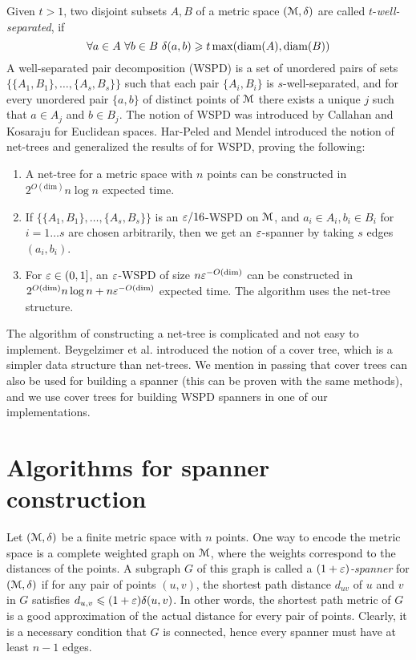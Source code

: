 \documentclass[a4paper,UKenglish,cleveref, autoref]{lipics-v2019}
\begin{document}
Given $t > 1$, two disjoint subsets $A, B$ of a metric space $(\mathcal{M}, \delta)$ are called $t$-\textit{well-separated},
if 
\[
\forall a \in A \,\, \forall b \in B \,\, \delta(a, b) \geqslant t \max(\mathrm{diam}(A), \mathrm{diam}(B))
\]
A well-separated pair decomposition (WSPD) is a set of unordered pairs of sets $\{ \{A_1, B_1 \}, 
\dots, \{A_s, B_s\} \}$ such that each pair $\{A_i, B_i\}$ is $s$-well-separated, and for every unordered pair $\{a, b\}$ of distinct points of $\mathcal{M}$ there exists a unique $j$ such that $a \in A_j$ and $b \in B_j$.
The notion of WSPD was introduced by Callahan and Kosaraju \cite{cal-kos-wspd} for Euclidean spaces.
Har-Peled and Mendel \cite{hm-fast} 
introduced the notion of net-trees and
generalized the results of \cite{cal-kos-wspd} for WSPD, proving the following:
\begin{enumerate}
    \item A net-tree for a metric space with $n$ points can be constructed in $2^{O(\mbox{dim})} n \log n$ expected time.
    \item If $\{ \{A_1, B_1 \}, 
\dots, \{A_s, B_s\} \}$ is an $\varepsilon / 16$-WSPD on $\mathcal{M}$, and $a_i \in A_i, b_i \in B_i$ for $i = 1\dots s$
are chosen arbitrarily, then we get an $\varepsilon$-spanner by taking $s$ edges $(a_i, b_i)$.
    \item For $\varepsilon \in (0, 1]$,  an $\varepsilon$-WSPD of size $n \varepsilon^{-O({\dim})}$ can be constructed in $2^{O({\dim})} n \log n + n \varepsilon ^{-O({\dim})}$ expected time. The algorithm uses the net-tree structure.
\end{enumerate}
The algorithm of constructing a net-tree is complicated and not easy to implement. Beygelzimer
et al. \cite{cover-trees} introduced the notion of a cover tree, which is a simpler data structure 
than net-trees. We mention in passing that cover trees can also be used for building
a spanner (this can be proven with the same methods), and we use cover trees for
building WSPD spanners in one of our implementations.


\section{Algorithms for spanner construction}

%
Let $(\mathcal{M}, \delta)$ be a finite metric space with $n$ points. 
One way to encode the metric space is a complete weighted graph on $\mathcal{M}$,
where the weights correspond to the distances of the points.
A subgraph $G$ of this graph is called a \emph{$(1+\varepsilon)$-spanner} for $(\mathcal{M},\delta)$ 
if for any pair of points $(u,v)$,
the shortest path distance $d_{uv}$ of $u$ and $v$ in $G$ satisfies $d_{u,v}\leqslant (1+\varepsilon)\delta(u,v)$.
In other words, the shortest path metric of $G$ is a good approximation of the actual distance for every pair of points.
Clearly, it is a necessary condition that $G$ is connected, hence every spanner must have at least $n-1$ edges.
\end{document}
